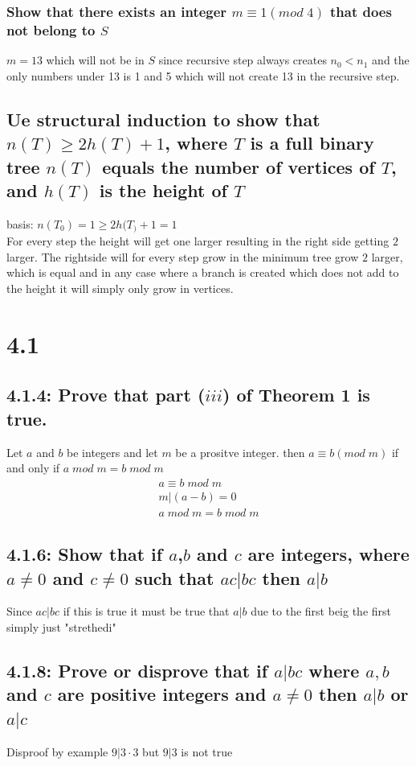 \documentclass[12pt, a4paper]{report}
\begin{document}
					\subsubsection{Show that there exists an integer $m\equiv 1 (mod\; 4)$ that does not belong to $S$}
						$m=13$ which will not be in $S$ since recursive step always creates $n_0<n_1$ and the only numbers under 13 is 1 and 5 which will not create 13 in the recursive step.
				\setcounter{subsection}{44}
				\subsection{Ue structural induction to show that $n(T)\geq 2h(T)+1$, where $T$ is a full binary tree $n(T)$ equals the number of vertices of $T$, and $h(T)$ is the height of $T$}
					basis: $n(T_0)=1 \geq 2h(T_)+1 = 1$\\
					For every step the height will get one larger resulting in the right side getting $2$ larger. The rightside will for every step grow in the minimum tree grow $2$ larger, which is equal and in any case where a branch is created which does not add to the height it will simply only grow in vertices.
			\section{4.1}
				\setcounter{subsection}{3}
				\subsection{4.1.4: Prove that part ($iii$) of Theorem 1 is true.}
					Let $a$ and $b$ be integers and let $m$ be a prositve integer. then $a\equiv b (mod\;m)$ if and only if $a\; mod\; m=b\;mod\;m$\\
					\begin{align*}
						a\equiv b \; mod\;m\\
						m|(a-b)=0\\
						a\;mod\;m=b\;mod\;m
					\end{align*}
				\setcounter{subsection}{5}
				\subsection{4.1.6: Show that if $a$,$b$ and $c$ are integers, where $a\neq 0$ and $c\neq 0$ such that $ac |bc$ then $a|b$}
					Since $ac|bc$ if this is true it must be true that $a|b$ due to the first beig the first simply just "strethedi"
				\setcounter{subsection}{7}
				\subsection{4.1.8: Prove or disprove that if $a|bc$ where $a,b$ and $c$ are positive integers and $a\neq 0$ then $a|b$ or $a|c$}
					Disproof by example $9|3\cdot3$ but $9|3$ is not true
				\setcounter{subsection}{12}
\end{document}
